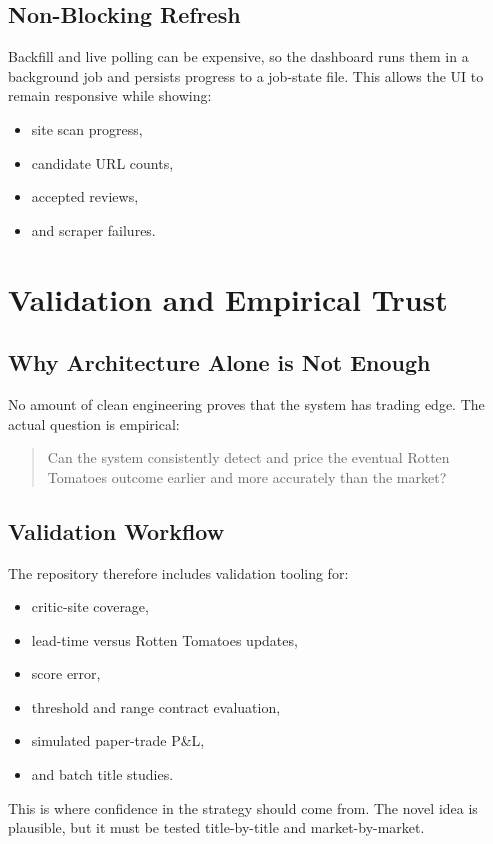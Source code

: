 \documentclass[11pt]{article}
\begin{document}
\subsection{Non-Blocking Refresh}
Backfill and live polling can be expensive, so the dashboard runs them in a background job and persists progress to a job-state file. This allows the UI to remain responsive while showing:
\begin{itemize}[leftmargin=1.5em]
    \item site scan progress,
    \item candidate URL counts,
    \item accepted reviews,
    \item and scraper failures.
\end{itemize}

\section{Validation and Empirical Trust}
\subsection{Why Architecture Alone is Not Enough}
No amount of clean engineering proves that the system has trading edge. The actual question is empirical:
\begin{quote}
Can the system consistently detect and price the eventual Rotten Tomatoes outcome earlier and more accurately than the market?
\end{quote}

\subsection{Validation Workflow}
The repository therefore includes validation tooling for:
\begin{itemize}[leftmargin=1.5em]
    \item critic-site coverage,
    \item lead-time versus Rotten Tomatoes updates,
    \item score error,
    \item threshold and range contract evaluation,
    \item simulated paper-trade P\&L,
    \item and batch title studies.
\end{itemize}

This is where confidence in the strategy should come from. The novel idea is plausible, but it must be tested title-by-title and market-by-market.
\end{document}
